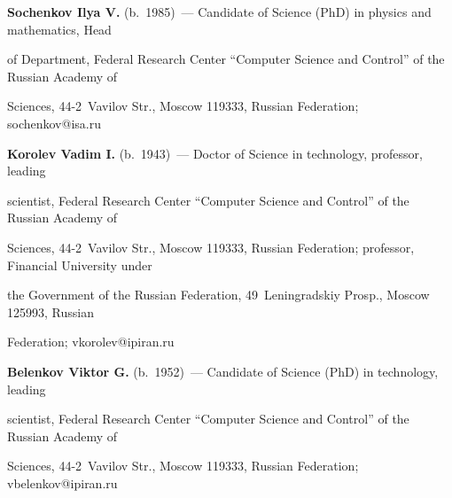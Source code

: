      


     \noindent


\textbf{Sochenkov Ilya V.} (b.\ 1985)~--- Candidate of Science (PhD) in physics and mathematics, Head 


of Department, Federal Research Center ``Computer Science and Control'' of the Russian Academy of 


Sciences, 44-2~Vavilov Str., Moscow 119333, Russian Federation; \mbox{sochenkov@isa.ru}


     


     \vspace*{3pt}


     


     \noindent


     \textbf{Korolev Vadim I.} (b.\ 1943)~--- Doctor of Science in technology, professor, leading 


scientist, Federal Research Center ``Computer Science and Control'' of the Russian Academy of 


Sciences, 44-2~Vavilov Str., Moscow 119333, Russian Federation; professor, Financial University under 


the Government of the Russian Federation, 49~Leningradskiy Prosp., Moscow 125993, Russian 


Federation; \mbox{vkorolev@ipiran.ru}


     


     \vspace*{3pt}


     


     \noindent


     \textbf{Belenkov Viktor G.} (b.\ 1952)~--- Candidate of Science (PhD) in technology, leading 


scientist, Federal Research Center ``Computer Science and Control'' of the Russian Academy of 


Sciences, 44-2~Vavilov Str., Moscow 119333, Russian Federation; \mbox{vbelenkov@ipiran.ru}


\label{end\stat}





\renewcommand{\bibname}{\protect\rm Литература} 


  


